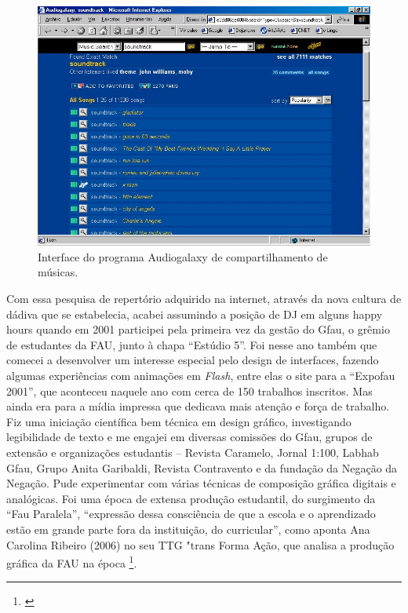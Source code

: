 \begin{figure}

\includegraphics[width=1\textwidth]{pictures/cap1/audiogalaxy}
\caption{Interface do programa Audiogalaxy de compartilhamento de músicas.}
\label{fig:audiogalaxy}
\end{figure}


Com essa pesquisa de repertório adquirido na internet, através da nova cultura de dádiva que se estabelecia, acabei assumindo a posição de DJ em alguns happy hours quando em 2001 participei pela primeira vez da gestão do Gfau, o grêmio de estudantes da FAU, junto à chapa ``Estúdio 5''. Foi nesse ano também que comecei a desenvolver um interesse especial pelo design de interfaces, fazendo algumas experiências com animações em \emph{Flash}, entre elas o site para a ``Expofau 2001'', que aconteceu naquele ano com cerca de 150 trabalhos inscritos. Mas ainda era para a mídia impressa que dedicava mais atenção e força de trabalho. Fiz uma iniciação científica bem técnica em design gráfico, investigando legibilidade de texto e me engajei em diversas comissões do Gfau, grupos de extensão e organizações estudantis – Revista Caramelo, Jornal 1:100, Labhab Gfau, Grupo Anita Garibaldi, Revista Contravento e da fundação da Negação da Negação. Pude experimentar com várias técnicas de composição gráfica digitais e analógicas. Foi uma época de extensa produção estudantil, do surgimento da ``Fau Paralela'', ``expressão dessa consciência de que a escola e o aprendizado estão em grande parte fora da instituição, do curricular'', como aponta Ana Carolina Ribeiro (2006) no seu TTG "trans Forma Ação, que analisa a produção gráfica da FAU na época \footnote{\cite{Ribeiro2006}}. 


